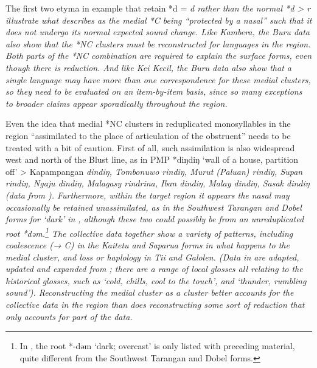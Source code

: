 The first two etyma in example  that retain *d = \it{d}
rather than the normal *d > \it{r} illustrate what \citet[293f]{Wolff2010}
describes as the medial *C being “protected by a nasal” such
that it does not undergo its normal expected sound change.
Like Kambera, the Buru data also show that the *NC clusters must
be reconstructed for languages in the region.
Both parts of the *NC combination are required to explain the
surface forms, even though there is reduction.
And like Kei Kecil,
the Buru data also show that a single language may have more
than one correspondence for these medial clusters,
so they need to be evaluated on an item-by-item basis,
since so many exceptions to broader claims appear sporadically
throughout the region.

Even the idea that medial *NC clusters in reduplicated monosyllables
in the region “assimilated to the place of articulation of the
obstruent” \citep[246]{Blust1993} needs to be treated with a bit of caution.
First of all, such assimilation is also widespread west
and north of the Blust line,
as in PMP *diŋdiŋ ‘wall of a house,
partition off’ > Kapampangan \it{dindiŋ},
Tombonuwo \it{rindiŋ}, Murut (Paluan) \it{rindiŋ}, Supan \it{rindiŋ},
Ngaju \it{dindiŋ}, Malagasy \it{rindrina},
Iban \it{dindiŋ}, Malay \it{dindiŋ},
Sasak \it{dindiŋ} (data from \citealp{BlustTrussel2020}).
Furthermore, within the target region it appears the nasal may
occasionally be retained unassimilated,
as in the Southwest Tarangan
and Dobel forms for ‘dark’ in ,
although these two could possibly be from an unreduplicated root
*dəm.\footnote{
		In \citet{BlustTrussel2020}, the root *-dəm
		‘dark; overcast’ is only listed with preceding
		material, quite different from the Southwest Tarangan
		and Dobel forms.}
The collective data together show a variety
of patterns, including coalescence (→ C) in the Kaitetu
and Saparua forms in what happens to the medial cluster,
and loss or haplology in Tii and Galolen.
(Data in  are adapted,
updated and expanded from \citet{Grimes1991a}; there are a range of
local glosses all relating to the historical glosses,
such as ‘cold, chills,
cool to the touch’,
and ‘thunder, rumbling sound’).
Reconstructing the medial cluster as a cluster better accounts
for the collective data in the region than does reconstructing
some sort of reduction that only accounts for part of the data.


